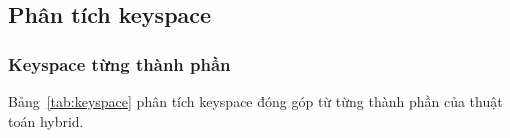 \subsection{Phân tích keyspace}

\subsubsection{Keyspace từng thành phần}

Bảng~\ref{tab:keyspace} phân tích keyspace đóng góp từ từng thành phần của thuật toán hybrid.

